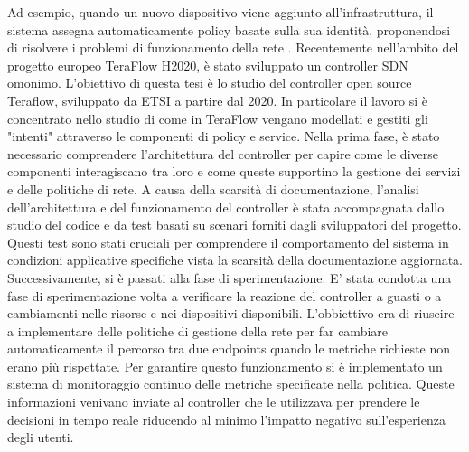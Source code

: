 Ad esempio, quando un nuovo dispositivo viene aggiunto all'infrastruttura, 
il sistema assegna automaticamente policy basate sulla sua identità, proponendosi di risolvere i problemi di funzionamento della rete \cite{qoe}.
\newline Recentemente nell'ambito del progetto europeo TeraFlow H2020, è stato sviluppato un controller SDN omonimo. 
L'obiettivo di questa tesi è lo studio del controller open source Teraflow, sviluppato da ETSI \cite{etsi} a partire dal 2020.
In particolare il lavoro si è concentrato nello studio di come in TeraFlow vengano modellati e gestiti gli "intenti" attraverso le componenti di policy e service.
Nella prima fase, è stato necessario comprendere l'architettura del controller per capire come le diverse componenti interagiscano tra loro e come queste supportino la gestione dei servizi e delle politiche di rete.
A causa della scarsità di documentazione, l'analisi dell'architettura e del funzionamento del controller è stata accompagnata dallo studio del codice e da test basati su scenari forniti dagli sviluppatori del progetto. 
Questi test sono stati cruciali per comprendere il comportamento del sistema in condizioni applicative specifiche vista la scarsità della documentazione aggiornata.
Successivamente, si è passati alla fase di sperimentazione.
E' stata condotta una fase di sperimentazione volta a verificare la reazione del controller a guasti o a cambiamenti nelle risorse e nei dispositivi disponibili.
L'obbiettivo era di riuscire a implementare delle politiche di gestione della rete per far cambiare automaticamente il percorso tra due endpoints quando le metriche richieste non erano più rispettate.
Per garantire questo funzionamento si è implementato un sistema di monitoraggio continuo delle metriche specificate nella politica.
Queste informazioni venivano inviate al controller che le utilizzava per prendere le decisioni in tempo reale riducendo al minimo l'impatto negativo sull'esperienza degli utenti. 
